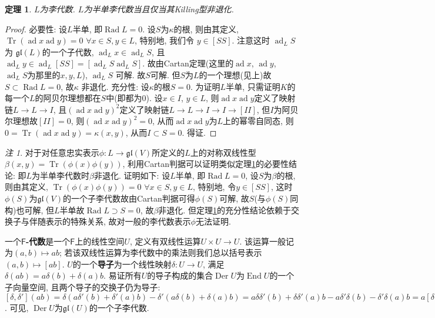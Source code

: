 \documentclass{ctexart}%
\newtheorem{theorem}{定理}
\theoremstyle{definition}
\theoremstyle{remark}
\newtheorem{remark}{注}
\DeclareMathOperator{\ad}{ad}
\DeclareMathOperator{\Tr}{Tr}
\DeclareMathOperator{\Rad}{Rad}
\DeclareMathOperator{\End}{End}
\DeclareMathOperator{\Der}{Der}
\begin{document}
\begin{theorem}\label{5.1}
$L$为李代数. $L$为半单李代数当且仅当其Killing型非退化. 
\end{theorem}
\begin{proof}
必要性: 设$L$半单, 即$\Rad L=0$. 设$S$为$\kappa$的根, 则由其定义, $\Tr(\ad x \ad y)=0$ $\forall x\in S, y\in L$, 特别地, 我们令 $y\in [SS]$. 注意这时 $\ad_LS$为 $\mathfrak{gl}(L)$的一个子代数, $\ad_L x\in \ad_LS$, 且 $\ad_L y \in \ad_L[SS]= [\ad_LS\ad_LS]$. 故由Cartan定理(这里的$\ad x$, $\ad y$, $\ad_L S$为那里的$x,y,L$), $\ad_L S$ 可解. 故$S$可解. 但$S$为$L$的一个理想(见上)故$S\subset \Rad L=0$, 故$\kappa$ 非退化. 充分性: 设$\kappa$的根$S=0$. 为证明$L$半单, 只需证明$K$的每一个$L$的阿贝尔理想都在$S$中(即都为0). 设$x\in I$, $y\in L$, 则$\ad x \ad y$定义了映射链$L\rightarrow L\rightarrow I$, 且$(\ad x\ad y)^2$定义了映射链$L\rightarrow L\rightarrow I\rightarrow I\rightarrow [II]$, 但$I$为阿贝尔理想故$[II]=0$, 则$(\ad x\ad y)^2=0$, 从而$\ad x \ad y$为$L$上的幂零自同态, 则$0=\Tr(\ad x \ad y)=\kappa(x,y)$, 从而$I\subset S=0$. 得证. 
\end{proof}
\begin{remark}
对于对任意忠实表示$\phi\colon L\rightarrow \mathfrak{gl}(V)$所定义的$L$上的对称双线性型$\beta(x,y)=\Tr(\phi(x)\phi(y))$, 利用Cartan判据可以证明类似定理\ref{5.1}的必要性结论: 即$L$为半单李代数时$\beta$非退化. 证明如下: 设$L$半单, 即$\Rad L=0$, 设$S$为$\beta$的根, 则由其定义, $\Tr(\phi(x)\phi(y))=0$ $\forall x\in S,y\in L$, 特别地, 令$y\in [SS]$, 这时$\phi(S)$为$\mathfrak{gl}(V)$的一个子李代数故由Cartan判据可得$\phi(S)$可解, 故$S$(与$\phi(S)$同构)也可解, 但$L$半单故$\Rad L\supset S=0$, 故$\beta$非退化. 但定理\ref{5.1}的充分性结论依赖于交换子与伴随表示的特殊关系, 故对一般的李代数表示$\phi$无法证明. 
\end{remark}
一个\textbf{$\mathsf{F}$-代数}是一个$\mathsf{F}$上的线性空间$U$, 定义有双线性运算$U\times U\rightarrow U$. 该运算一般记为$(a,b)\mapsto ab$; 若该双线性运算为李代数中的乘法则我们总以括号表示$(a,b)\mapsto [ab]$. $U$的一个\textbf{导子}为一个线性映射$\delta\colon U\rightarrow U$, 满足$\delta(ab)=a\delta(b)+\delta(a) b$. 易证所有$U$的导子构成的集合$\Der U$为$\End U$的一个子向量空间, 且两个导子的交换子仍为导子: $[\delta,\delta'](ab)=\delta(a\delta'(b)+\delta'(a) b)-\delta'(a\delta(b)+\delta(a) b) = a \delta\delta'(b)+\delta\delta'(a) b - a \delta'\delta(b)-\delta'\delta(a) b = a[\delta,\delta'](b)+[\delta,\delta'](a)b$. 可见, $\Der U$为$\mathfrak{gl}(U)$的一个子李代数.  
\end{document}
